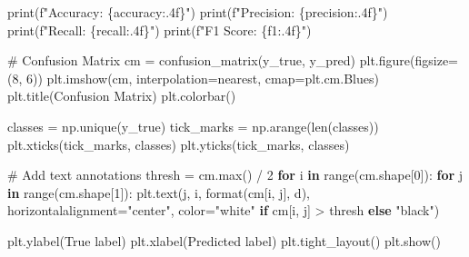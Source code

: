 \documentclass[
  letterpaper,
  DIV=11,
  numbers=noendperiod]{scrreprt}
\newenvironment{Shaded}{\begin{snugshade}}{\end{snugshade}}
\newcommand{\BuiltInTok}[1]{\textcolor[rgb]{0.00,0.23,0.31}{#1}}
\newcommand{\CommentTok}[1]{\textcolor[rgb]{0.37,0.37,0.37}{#1}}
\newcommand{\ControlFlowTok}[1]{\textcolor[rgb]{0.00,0.23,0.31}{\textbf{#1}}}
\newcommand{\DecValTok}[1]{\textcolor[rgb]{0.68,0.00,0.00}{#1}}
\newcommand{\KeywordTok}[1]{\textcolor[rgb]{0.00,0.23,0.31}{\textbf{#1}}}
\newcommand{\NormalTok}[1]{\textcolor[rgb]{0.00,0.23,0.31}{#1}}
\newcommand{\OperatorTok}[1]{\textcolor[rgb]{0.37,0.37,0.37}{#1}}
\newcommand{\SpecialCharTok}[1]{\textcolor[rgb]{0.37,0.37,0.37}{#1}}
\newcommand{\SpecialStringTok}[1]{\textcolor[rgb]{0.13,0.47,0.30}{#1}}
\newcommand{\StringTok}[1]{\textcolor[rgb]{0.13,0.47,0.30}{#1}}
\begin{document}
\begin{Shaded}
\begin{Highlighting}[]
    \BuiltInTok{print}\NormalTok{(}\SpecialStringTok{f"Accuracy: }\SpecialCharTok{\{}\NormalTok{accuracy}\SpecialCharTok{:.4f\}}\SpecialStringTok{"}\NormalTok{)}
    \BuiltInTok{print}\NormalTok{(}\SpecialStringTok{f"Precision: }\SpecialCharTok{\{}\NormalTok{precision}\SpecialCharTok{:.4f\}}\SpecialStringTok{"}\NormalTok{)}
    \BuiltInTok{print}\NormalTok{(}\SpecialStringTok{f"Recall: }\SpecialCharTok{\{}\NormalTok{recall}\SpecialCharTok{:.4f\}}\SpecialStringTok{"}\NormalTok{)}
    \BuiltInTok{print}\NormalTok{(}\SpecialStringTok{f"F1 Score: }\SpecialCharTok{\{}\NormalTok{f1}\SpecialCharTok{:.4f\}}\SpecialStringTok{"}\NormalTok{)}
    
    \CommentTok{\# Confusion Matrix}
\NormalTok{    cm }\OperatorTok{=}\NormalTok{ confusion\_matrix(y\_true, y\_pred)}
\NormalTok{    plt.figure(figsize}\OperatorTok{=}\NormalTok{(}\DecValTok{8}\NormalTok{, }\DecValTok{6}\NormalTok{))}
\NormalTok{    plt.imshow(cm, interpolation}\OperatorTok{=}\StringTok{\textquotesingle{}nearest\textquotesingle{}}\NormalTok{, cmap}\OperatorTok{=}\NormalTok{plt.cm.Blues)}
\NormalTok{    plt.title(}\StringTok{\textquotesingle{}Confusion Matrix\textquotesingle{}}\NormalTok{)}
\NormalTok{    plt.colorbar()}
    
\NormalTok{    classes }\OperatorTok{=}\NormalTok{ np.unique(y\_true)}
\NormalTok{    tick\_marks }\OperatorTok{=}\NormalTok{ np.arange(}\BuiltInTok{len}\NormalTok{(classes))}
\NormalTok{    plt.xticks(tick\_marks, classes)}
\NormalTok{    plt.yticks(tick\_marks, classes)}
    
    \CommentTok{\# Add text annotations}
\NormalTok{    thresh }\OperatorTok{=}\NormalTok{ cm.}\BuiltInTok{max}\NormalTok{() }\OperatorTok{/} \DecValTok{2}
    \ControlFlowTok{for}\NormalTok{ i }\KeywordTok{in} \BuiltInTok{range}\NormalTok{(cm.shape[}\DecValTok{0}\NormalTok{]):}
        \ControlFlowTok{for}\NormalTok{ j }\KeywordTok{in} \BuiltInTok{range}\NormalTok{(cm.shape[}\DecValTok{1}\NormalTok{]):}
\NormalTok{            plt.text(j, i, }\BuiltInTok{format}\NormalTok{(cm[i, j], }\StringTok{\textquotesingle{}d\textquotesingle{}}\NormalTok{),}
\NormalTok{                     horizontalalignment}\OperatorTok{=}\StringTok{"center"}\NormalTok{,}
\NormalTok{                     color}\OperatorTok{=}\StringTok{"white"} \ControlFlowTok{if}\NormalTok{ cm[i, j] }\OperatorTok{\textgreater{}}\NormalTok{ thresh }\ControlFlowTok{else} \StringTok{"black"}\NormalTok{)}
    
\NormalTok{    plt.ylabel(}\StringTok{\textquotesingle{}True label\textquotesingle{}}\NormalTok{)}
\NormalTok{    plt.xlabel(}\StringTok{\textquotesingle{}Predicted label\textquotesingle{}}\NormalTok{)}
\NormalTok{    plt.tight\_layout()}
\NormalTok{    plt.show()}
    

\end{Highlighting}
\end{Shaded}
\end{document}
